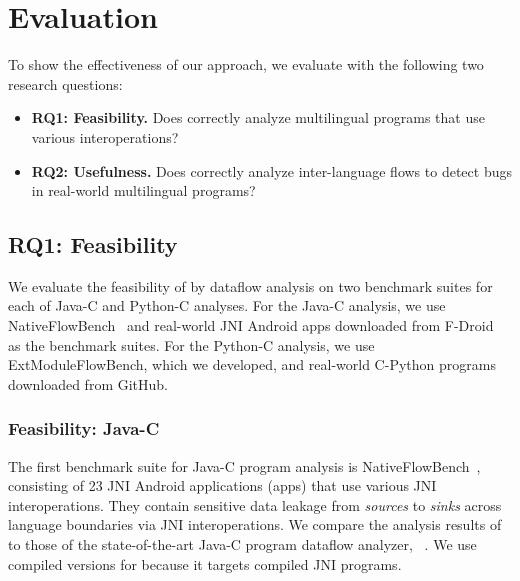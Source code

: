 \newcommand{\req}[1]{RQ#1}

\section{Evaluation}\label{sec:eval}



To show the effectiveness of our approach, we evaluate
\ours with the following two research questions:
\begin{itemize}
  \item \textbf{\req{1}: Feasibility.} Does \ours correctly analyze multilingual
    programs that use various interoperations?

  \item \textbf{\req{2}: Usefulness.} Does \ours correctly analyze inter-language
    flows to detect bugs in real-world multilingual programs?
\end{itemize}

\subsection{\req{1}: Feasibility}
We evaluate the feasibility of \ours by dataflow analysis on two benchmark
suites for each of Java-C and Python-C analyses.  For the Java-C analysis, we
use NativeFlowBench~\cite{nativeflowbench, JN-SAF} and real-world JNI Android
apps downloaded from F-Droid~\cite{fdroid} as the benchmark suites.  For the
Python-C analysis, we use ExtModuleFlowBench, which we developed, and
real-world C-Python programs downloaded from GitHub.

\subsubsection{Feasibility: Java-C}
The first benchmark suite for Java-C program analysis is
NativeFlowBench~\cite{nativeflowbench, JN-SAF}, consisting of 23 JNI Android
applications (apps) that use various JNI interoperations.  They contain
sensitive data leakage from {\it sources} to {\it sinks} across language
boundaries via JNI interoperations.  We compare the analysis results of \ours
to those of the state-of-the-art Java-C program dataflow analyzer,
\jnsaf~\cite{JN-SAF}. We use compiled versions for \jnsaf because it targets
compiled JNI programs.

